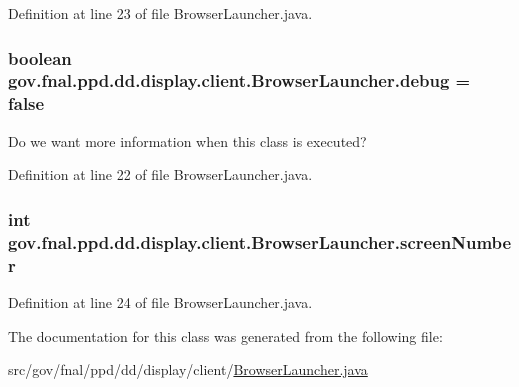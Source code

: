 Definition at line 23 of file Browser\-Launcher.\-java.

\hypertarget{classgov_1_1fnal_1_1ppd_1_1dd_1_1display_1_1client_1_1BrowserLauncher_a1e0101712e66f938f905b9b17baf101d}{
\subsubsection[{debug}]{\setlength{\rightskip}{0pt plus 5cm}boolean gov.\-fnal.\-ppd.\-dd.\-display.\-client.\-Browser\-Launcher.\-debug = false\hspace{0.3cm}{\ttfamily [static]}}}\label{classgov_1_1fnal_1_1ppd_1_1dd_1_1display_1_1client_1_1BrowserLauncher_a1e0101712e66f938f905b9b17baf101d}
Do we want more information when this class is executed? 

Definition at line 22 of file Browser\-Launcher.\-java.

\hypertarget{classgov_1_1fnal_1_1ppd_1_1dd_1_1display_1_1client_1_1BrowserLauncher_aa30aa801b0b7b60138f39610c4e2f211}{
\subsubsection[{screen\-Number}]{\setlength{\rightskip}{0pt plus 5cm}int gov.\-fnal.\-ppd.\-dd.\-display.\-client.\-Browser\-Launcher.\-screen\-Number\hspace{0.3cm}{\ttfamily [protected]}}}\label{classgov_1_1fnal_1_1ppd_1_1dd_1_1display_1_1client_1_1BrowserLauncher_aa30aa801b0b7b60138f39610c4e2f211}


Definition at line 24 of file Browser\-Launcher.\-java.



The documentation for this class was generated from the following file\-:\begin{DoxyCompactItemize}
\item 
src/gov/fnal/ppd/dd/display/client/\hyperlink{BrowserLauncher_8java}{Browser\-Launcher.\-java}\end{DoxyCompactItemize}
